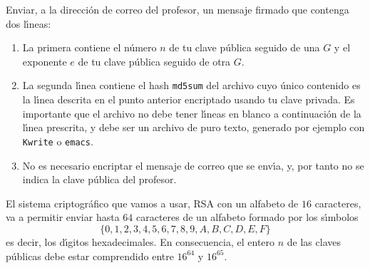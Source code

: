 \begin{ejer}
Enviar, a la direcci\'on de correo del profesor, un mensaje
firmado que contenga dos l\'{\i}neas: 
\begin{enumerate}
 \item La primera contiene el n\'umero $n$ de tu clave p\'ublica seguido de una $G$ y el exponente $e$ de tu clave p\'ublica seguido de otra $G$.
 \item La segunda l\'{\i}nea contiene el hash {\tt md5sum} del archivo cuyo \'unico contenido es 
la  l\'{\i}nea descrita en el punto anterior encriptado usando tu clave privada. Es importante que el
archivo no debe tener l\'{\i}neas en blanco a continuaci\'on de la l\'{\i}nea
prescrita, y debe ser un archivo de puro texto, generado por ejemplo con {\tt
Kwrite} o {\tt emacs}.
\item No es necesario encriptar el mensaje de correo que se env\'{\i}a, y, por tanto no se indica la clave p\'ublica del profesor.  
 \end{enumerate}

El sistema criptogr\'afico que vamos a usar, RSA con un alfabeto de $16$ caracteres,  va a permitir enviar hasta $64$
caracteres de un alfabeto formado por los s\'{\i}mbolos 
\[\{0,1,2,3,4,5,6,7,8,9,A,B,C,D,E,F\}\]
\noindent es decir, los d\'{\i}gitos hexadecimales. En consecuencia, el entero $n$ de las claves p\'ublicas debe estar
comprendido entre $16^{64}$ y $16^{65}$. 






\begin{comment}
\item La clave p\'ublica del profesor es 

\parbox{10cm}{
\begin{multline}\notag
n=71363142363625075980282266252488201014221249946\\
6855333247864128528383524853183,
\end{multline}
}
\[e=268435457. \]
\end{comment} 
\end{ejer}





